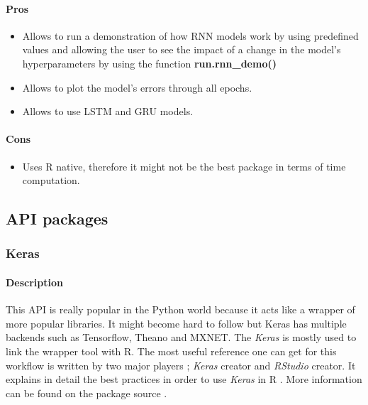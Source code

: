 \documentclass[letter,8pt]{article}\usepackage[]{graphicx}\usepackage[]{color}
\begin{document}
\paragraph{Pros}
\begin{itemize}
\item Allows to run a demonstration of how RNN models work by using predefined values and allowing the user to see the impact of a change in the model's hyperparameters by using the function \textbf{run.rnn\_demo()}
\item Allows to plot the model's errors through all epochs.
\item Allows to use LSTM and GRU models.
\end{itemize}
\paragraph{Cons}
\begin{itemize}
\item Uses R native, therefore it might not be the best package in terms of time computation.
\end{itemize}

\subsection{API packages}

\subsubsection{Keras}
\paragraph{Description}
This API is really popular in the Python world because it acts like a wrapper of more popular libraries. It might become hard to follow but Keras has multiple backends such as Tensorflow, Theano and MXNET. The \textit{Keras} is mostly used to link the wrapper tool with R. The most useful reference one can get for this workflow is written by two major players ; \textit{Keras} creator and \textit{RStudio} creator. It explains in detail the best practices in order to use \textit{Keras} in R \cite{chollet2018deep}. More information can be found on the package source \cite{keras2019}.
\end{document}
